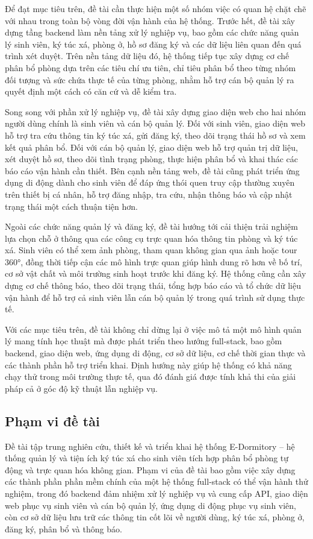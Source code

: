 \documentclass[../DoAn.tex]{subfiles}
\begin{document}
Để đạt mục tiêu trên, đề tài cần thực hiện một số nhóm việc có quan hệ chặt chẽ với nhau trong toàn bộ vòng đời vận hành của hệ thống. Trước hết, đề tài xây dựng tầng backend làm nền tảng xử lý nghiệp vụ, bao gồm các chức năng quản lý sinh viên, ký túc xá, phòng ở, hồ sơ đăng ký và các dữ liệu liên quan đến quá trình xét duyệt. Trên nền tảng dữ liệu đó, hệ thống tiếp tục xây dựng cơ chế phân bổ phòng dựa trên các tiêu chí ưu tiên, chỉ tiêu phân bổ theo từng nhóm đối tượng và sức chứa thực tế của từng phòng, nhằm hỗ trợ cán bộ quản lý ra quyết định một cách có căn cứ và dễ kiểm tra.

Song song với phần xử lý nghiệp vụ, đề tài xây dựng giao diện web cho hai nhóm người dùng chính là sinh viên và cán bộ quản lý. Đối với sinh viên, giao diện web hỗ trợ tra cứu thông tin ký túc xá, gửi đăng ký, theo dõi trạng thái hồ sơ và xem kết quả phân bổ. Đối với cán bộ quản lý, giao diện web hỗ trợ quản trị dữ liệu, xét duyệt hồ sơ, theo dõi tình trạng phòng, thực hiện phân bổ và khai thác các báo cáo vận hành cần thiết. Bên cạnh nền tảng web, đề tài cũng phát triển ứng dụng di động dành cho sinh viên để đáp ứng thói quen truy cập thường xuyên trên thiết bị cá nhân, hỗ trợ đăng nhập, tra cứu, nhận thông báo và cập nhật trạng thái một cách thuận tiện hơn.

Ngoài các chức năng quản lý và đăng ký, đề tài hướng tới cải thiện trải nghiệm lựa chọn chỗ ở thông qua các công cụ trực quan hóa thông tin phòng và ký túc xá. Sinh viên có thể xem ảnh phòng, tham quan không gian qua ảnh hoặc tour 360°, đồng thời tiếp cận các mô hình trực quan giúp hình dung rõ hơn về bố trí, cơ sở vật chất và môi trường sinh hoạt trước khi đăng ký. Hệ thống cũng cần xây dựng cơ chế thông báo, theo dõi trạng thái, tổng hợp báo cáo và tổ chức dữ liệu vận hành để hỗ trợ cả sinh viên lẫn cán bộ quản lý trong quá trình sử dụng thực tế.

Với các mục tiêu trên, đề tài không chỉ dừng lại ở việc mô tả một mô hình quản lý mang tính học thuật mà được phát triển theo hướng full-stack, bao gồm backend, giao diện web, ứng dụng di động, cơ sở dữ liệu, cơ chế thời gian thực và các thành phần hỗ trợ triển khai. Định hướng này giúp hệ thống có khả năng chạy thử trong môi trường thực tế, qua đó đánh giá được tính khả thi của giải pháp cả ở góc độ kỹ thuật lẫn nghiệp vụ.


\subsection{Phạm vi đề tài}
Đề tài tập trung nghiên cứu, thiết kế và triển khai hệ thống E-Dormitory -- hệ thống quản lý và tiện ích ký túc xá cho sinh viên tích hợp phân bổ phòng tự động và trực quan hóa không gian. Phạm vi của đề tài bao gồm việc xây dựng các thành phần phần mềm chính của một hệ thống full-stack có thể vận hành thử nghiệm, trong đó backend đảm nhiệm xử lý nghiệp vụ và cung cấp API, giao diện web phục vụ sinh viên và cán bộ quản lý, ứng dụng di động phục vụ sinh viên, còn cơ sở dữ liệu lưu trữ các thông tin cốt lõi về người dùng, ký túc xá, phòng ở, đăng ký, phân bổ và thông báo.
\end{document}
